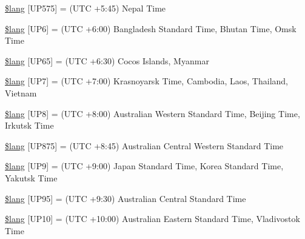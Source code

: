 \begin{DoxyCompactItemize}
\item 
\hyperlink{system_2language_2english_2date__lang_8php_abc4186fc3bc853aa036b5b11eeb52ecd}{\$lang} \mbox{[}\textquotesingle{}U\+P575\textquotesingle{}\mbox{]} = \textquotesingle{}(U\+T\+C +5\+:45) Nepal Time\textquotesingle{}
\item 
\hyperlink{system_2language_2english_2date__lang_8php_aaa655de76a3be875d9cedbf4a57244fa}{\$lang} \mbox{[}\textquotesingle{}U\+P6\textquotesingle{}\mbox{]} = \textquotesingle{}(U\+T\+C +6\+:00) Bangladesh Standard Time, Bhutan Time, Omsk Time\textquotesingle{}
\item 
\hyperlink{system_2language_2english_2date__lang_8php_af94f885b6e6c50abdf7672ddfa80774d}{\$lang} \mbox{[}\textquotesingle{}U\+P65\textquotesingle{}\mbox{]} = \textquotesingle{}(U\+T\+C +6\+:30) Cocos Islands, Myanmar\textquotesingle{}
\item 
\hyperlink{system_2language_2english_2date__lang_8php_aeedffaf1d3a16a41e881d85c420482ce}{\$lang} \mbox{[}\textquotesingle{}U\+P7\textquotesingle{}\mbox{]} = \textquotesingle{}(U\+T\+C +7\+:00) Krasnoyarsk Time, Cambodia, Laos, Thailand, Vietnam\textquotesingle{}
\item 
\hyperlink{system_2language_2english_2date__lang_8php_a2a828a680158ca4cfb7fba60f35c67a3}{\$lang} \mbox{[}\textquotesingle{}U\+P8\textquotesingle{}\mbox{]} = \textquotesingle{}(U\+T\+C +8\+:00) Australian Western Standard Time, Beijing Time, Irkutsk Time\textquotesingle{}
\item 
\hyperlink{system_2language_2english_2date__lang_8php_a486696d3d41c5d263a8b550903052ecb}{\$lang} \mbox{[}\textquotesingle{}U\+P875\textquotesingle{}\mbox{]} = \textquotesingle{}(U\+T\+C +8\+:45) Australian Central Western Standard Time\textquotesingle{}
\item 
\hyperlink{system_2language_2english_2date__lang_8php_aa112bfd057369e5adb437c55457c9f79}{\$lang} \mbox{[}\textquotesingle{}U\+P9\textquotesingle{}\mbox{]} = \textquotesingle{}(U\+T\+C +9\+:00) Japan Standard Time, Korea Standard Time, Yakutsk Time\textquotesingle{}
\item 
\hyperlink{system_2language_2english_2date__lang_8php_a96965669ac4830ab024b39a4ebb763f1}{\$lang} \mbox{[}\textquotesingle{}U\+P95\textquotesingle{}\mbox{]} = \textquotesingle{}(U\+T\+C +9\+:30) Australian Central Standard Time\textquotesingle{}
\item 
\hyperlink{system_2language_2english_2date__lang_8php_ab55df5b1ac6457c16ea32f01070966f6}{\$lang} \mbox{[}\textquotesingle{}U\+P10\textquotesingle{}\mbox{]} = \textquotesingle{}(U\+T\+C +10\+:00) Australian Eastern Standard Time, Vladivostok Time\textquotesingle{}

\end{DoxyCompactItemize}
